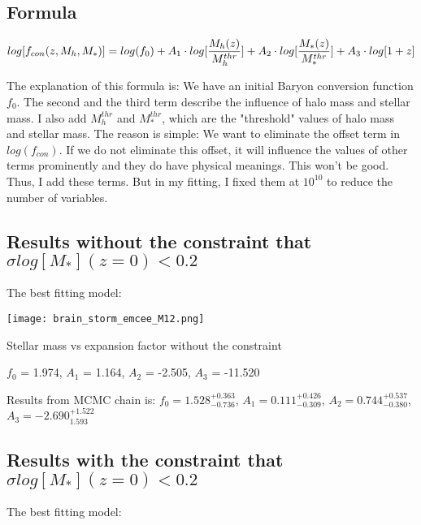 \documentclass[ajp]{article}   	%
\begin{document}
\subsection{Formula}


\begin{equation}
log[f_{con}(z,M_h, M_*)] = log(f_0) + A_1 \cdot log[{{M_h(z)} \over{M_h^{thr}}}]+ A_2 \cdot log[{{M_*(z)} \over{M_*^{thr}}}] + A_3 \cdot log[1+z]
\end{equation}
\bigskip

The explanation of this formula is: We have an initial Baryon conversion function $f_0$. The second and the third term describe the influence of halo mass and stellar mass. I also add $M_h^{thr}$ and $M_*^{thr}$, which are the "threshold" values of halo mass and stellar mass. The reason is simple: We want to eliminate the offset term in $log(f_{con})$. If we do not eliminate this offset, it will influence the values of other terms prominently and they do have physical meanings. This won't be good. Thus, I add these terms.
But in my fitting, I fixed them at $10^{10}$ to reduce the number of variables.




\subsection{Results without the constraint that $\sigma log[M_*](z=0) <0.2$}
The best fitting model:

\begin{center}
\texttt{[image: brain\_storm\_emcee\_M12.png]}

\centerline{Stellar mass vs expansion factor without the constraint}

\end{center}

$f_0$ = 1.974, $A_1$ = 1.164, $A_2$ = -2.505, $A_3$ = -11.520

\bigskip


Results from MCMC chain is:
$f_0=1.528^{+0.363}_{-0.736}$, $A_1=0.111^{+0.426}_{-0.309}$, $A_2=0.744^{+0.537}_{-0.380}$, $A_3 = -2.690^{+1.522}_{1.593}$

\subsection{Results with the constraint that $\sigma log[M_*](z=0) <0.2$}
The best fitting model:
\end{document}
